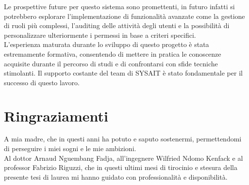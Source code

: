 \documentclass[a4paper, 12pt]{book}
\begin{document}
Le prospettive future per questo sistema sono promettenti, in futuro infatti si potrebbero esplorare l'implementazione
di funzionalità avanzate come la gestione di ruoli più complessi, l'auditing delle attività degli utenti e la
possibilità di personalizzare ulteriormente i permessi in base a criteri specifici.\\

L'esperienza maturata durante lo sviluppo di questo progetto è stata estremamente formativa, consentendo di mettere
in pratica le conoscenze acquisite durante il percorso di studi e di confrontarsi con sfide tecniche stimolanti.
Il supporto costante del team di SYSAIT è stato fondamentale per il successo di questo lavoro.



\thispagestyle{empty}

\printbibliography[sorting=ymdnt]



\chapter*{Ringraziamenti}

\thispagestyle{empty}


A mia madre, che in questi anni ha potuto e saputo sostenermi, permettendomi di perseguire i miei sogni e le mie ambizioni.\\

Al dottor Arnaud Nguembang Fadja, all'ingegnere Wilfried Ndomo Kenfack e al professor Fabrizio Riguzzi, che in questi ultimi mesi
di tirocinio e stesura della presente tesi di laurea mi hanno guidato con professionalità e disponibilità.

\end{document}
